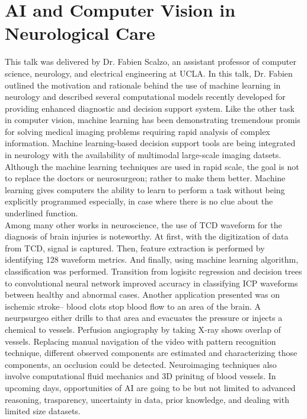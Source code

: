 \documentclass{report}
\begin{document}
\section{AI and Computer Vision in Neurological Care}
This talk was delivered by Dr. Fabien Scalzo, an assistant professor of computer science, neurology, and electrical engineering at UCLA. In this talk, Dr. Fabien outlined the motivation and rationale behind the use of machine learning in neurology and described several computational models recently developed for providing enhanced diagnostic and decision support system. Like the other task in computer vision, machine learning has been demonstrating tremendous promis for solving medical imaging problems requiring rapid analysis of complex information. Machine learning-based decision support tools are being integrated in neurology with the availability of multimodal large-scale imaging datsets. Although the machine learning techniques are used in rapid scale, the goal is not to replace the doctors or neurosurgeon; rather to make them better. Machine learning gives computers the ability to learn to perform a task without being explicitly programmed especially, in case where there is no clue about the underlined function. \\

Among many other works in neuroscience, the use of TCD waveform for the diagnosis of brain injuries is noteworthy. At first, with the digitization of data from TCD, signal is captured. Then, feature extraction is performed by identifying 128 waveform metrics. And finally, using machine learning algorithm, classification was performed. Transition from logisitc regression and decision trees to convolutional neural network improved accuracy in classifying ICP waveforms between healthy and abnormal cases. Another application presented was on ischemic stroke-- blood clots stop blood flow to an area of the brain. A neurpsurgeo either drills to that area and evacuates the pressure or injects a chemical to vessels. Perfusion angiography by taking X-ray shows overlap of vessels. Replacing manual navigation of the video with pattern recognition technique, different observed components are estimated and characterizing those components, an occlusion could be detected. Neuroimaging techniques also involve computational fluid mechanics and 3D prinitng of blood vessels. In upcoming days, opportunities of AI are going to be but not limited to advanced reasoning, trasparency, uncertainty in data, prior knowledge, and dealing with limited size datasets.      
\end{document}
